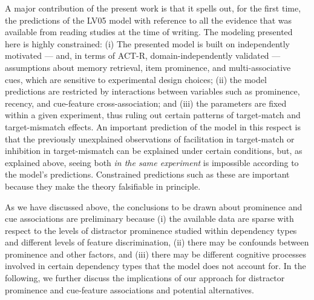 \documentclass{cambridge7A}\usepackage[]{graphicx}\usepackage[]{color}
\begin{document}
A major contribution of the present work is 
that it spells out, for the first time, 
the predictions of the LV05 model with reference to all the evidence that was available from reading studies at the time of writing. The modeling presented here is highly constrained:
(i) The presented model is built on independently motivated --- and, in terms of ACT-R, domain-independently validated --- assumptions about  memory retrieval,  item prominence, and multi-associative cues, which are sensitive to experimental design choices; (ii) the model predictions are restricted by interactions between variables such as prominence,  recency, and cue-feature cross-association; and (iii) the parameters are fixed within a given experiment, thus ruling out certain patterns of target-match and target-mismatch effects. 
An important prediction of the model in this respect is that the previously unexplained observations of facilitation in target-match or inhibition in target-mismatch can be explained under certain conditions, but,  as explained above, seeing both \textit{in the same experiment} is impossible according to the model's predictions.
Constrained predictions such as these are important because they make the theory falsifiable in principle.

As we have discussed above, the conclusions to be drawn about prominence and cue associations are preliminary because (i) the available data are sparse with respect to the levels of distractor prominence studied within dependency types and different levels of feature discrimination, (ii) there may be confounds between prominence and other factors, and (iii) there may be different cognitive processes involved in certain dependency types that the model does not account for.
In the following, we further discuss the implications of our approach for distractor prominence and cue-feature associations and potential alternatives.
\end{document}
